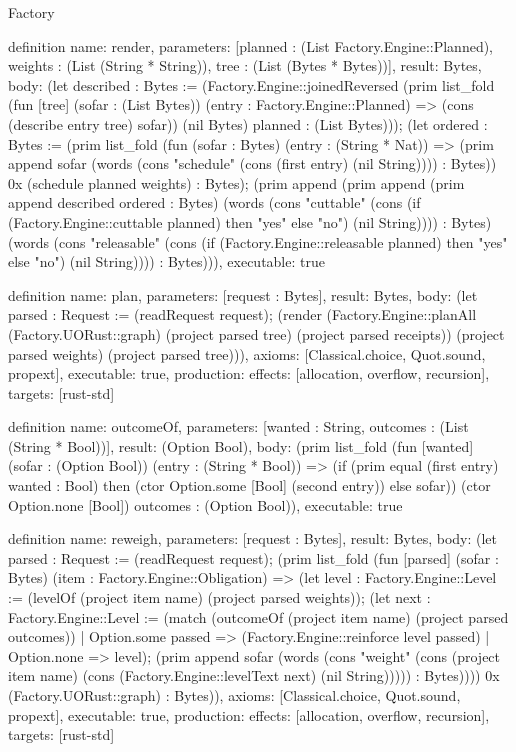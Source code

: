 \begin{lexlean}{Factory}
\begin{semanticmodule}
definition{
  name: render,
  parameters: [planned : (List Factory.Engine::Planned), weights : (List (String * String)), tree : (List (Bytes * Bytes))],
  result: Bytes,
  body: (let described : Bytes := (Factory.Engine::joinedReversed (prim list_fold (fun [tree] (sofar : (List Bytes)) (entry : Factory.Engine::Planned) => (cons (describe entry tree) sofar)) (nil Bytes) planned : (List Bytes))); (let ordered : Bytes := (prim list_fold (fun (sofar : Bytes) (entry : (String * Nat)) => (prim append sofar (words (cons "schedule" (cons (first entry) (nil String)))) : Bytes)) 0x (schedule planned weights) : Bytes); (prim append (prim append (prim append described ordered : Bytes) (words (cons "cuttable" (cons (if (Factory.Engine::cuttable planned) then "yes" else "no") (nil String)))) : Bytes) (words (cons "releasable" (cons (if (Factory.Engine::releasable planned) then "yes" else "no") (nil String)))) : Bytes))),
  executable: true
}

definition{
  name: plan,
  parameters: [request : Bytes],
  result: Bytes,
  body: (let parsed : Request := (readRequest request); (render (Factory.Engine::planAll (Factory.UORust::graph) (project parsed tree) (project parsed receipts)) (project parsed weights) (project parsed tree))),
  axioms: [Classical.choice, Quot.sound, propext],
  executable: true,
  production: {effects: [allocation, overflow, recursion], targets: [rust-std]}
}

definition{
  name: outcomeOf,
  parameters: [wanted : String, outcomes : (List (String * Bool))],
  result: (Option Bool),
  body: (prim list_fold (fun [wanted] (sofar : (Option Bool)) (entry : (String * Bool)) => (if (prim equal (first entry) wanted : Bool) then (ctor Option.some [Bool] (second entry)) else sofar)) (ctor Option.none [Bool]) outcomes : (Option Bool)),
  executable: true
}

definition{
  name: reweigh,
  parameters: [request : Bytes],
  result: Bytes,
  body: (let parsed : Request := (readRequest request); (prim list_fold (fun [parsed] (sofar : Bytes) (item : Factory.Engine::Obligation) => (let level : Factory.Engine::Level := (levelOf (project item name) (project parsed weights)); (let next : Factory.Engine::Level := (match (outcomeOf (project item name) (project parsed outcomes))
      | Option.some passed => (Factory.Engine::reinforce level passed)
      | Option.none => level); (prim append sofar (words (cons "weight" (cons (project item name) (cons (Factory.Engine::levelText next) (nil String))))) : Bytes)))) 0x (Factory.UORust::graph) : Bytes)),
  axioms: [Classical.choice, Quot.sound, propext],
  executable: true,
  production: {effects: [allocation, overflow, recursion], targets: [rust-std]}
}
\end{semanticmodule}
\end{lexlean}
